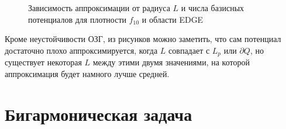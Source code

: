 \documentclass[a4paper, 12pt]{article}
\begin{document}
                    \begin{figure}[h!]
                      \noindent{}
                      \caption{Зависимость аппроксимации от радиуса $L$ и числа базисных потенциалов для плотности $f_{10}$ и области EDGE}
                      \label{neustend}
                      \end{figure} 

Кроме неустойчивости ОЗГ, из рисунков можно заметить, что сам потенциал достаточно плохо аппроксимируется, когда $L$ совпадает с $L_p$ или $\partial Q$, но существует некоторая $L$ между этими двумя значениями, на которой аппроксимация будет намного лучше средней.

\section*{ }
\part{Бигармоническая задача}
\end{document}

